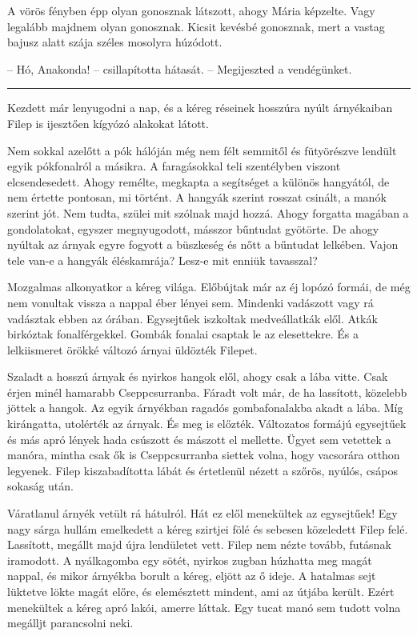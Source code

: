 \documentclass[10pt]{memoir}
\renewcommand{\pfbreakdisplay}{\bigskip \ding{166} \bigskip}
\newcommand{\secbreak}{\fancybreak{\pfbreakdisplay}\indent}
\begin{document}
A vörös fényben épp olyan gonosznak látszott, ahogy Mária képzelte. Vagy
legalább majdnem olyan gonosznak. Kicsit kevésbé gonosznak, mert a vastag
bajusz alatt szája széles mosolyra húzódott.

-- Hó, Anakonda! -- csillapította hátasát. -- Megijeszted a vendégünket.

\secbreak

Kezdett már lenyugodni a nap, és a kéreg réseinek hosszúra nyúlt árnyékaiban
Filep is ijesztően kígyózó alakokat látott.

Nem sokkal azelőtt a pók hálóján még nem félt semmitől és fütyörészve lendült
egyik pókfonalról a másikra. A faragásokkal teli szentélyben viszont
elcsendesedett. Ahogy remélte, megkapta a segítséget a különös hangyától, de
nem értette pontosan, mi történt. A hangyák szerint rosszat csinált, a manók
szerint jót. Nem tudta, szülei mit szólnak majd hozzá. Ahogy forgatta magában a
gondolatokat, egyszer megnyugodott, másszor bűntudat gyötörte. De ahogy nyúltak
az árnyak egyre fogyott a büszkeség és nőtt a bűntudat lelkében. Vajon tele
van-e a hangyák éléskamrája? Lesz-e mit enniük tavasszal?

Mozgalmas alkonyatkor a kéreg világa. Előbújtak már az éj lopózó formái, de még
nem vonultak vissza a nappal éber lényei sem. Mindenki vadászott vagy rá
vadásztak ebben az órában. Egysejtűek iszkoltak medveállatkák elől. Atkák
birkóztak fonalférgekkel. Gombák fonalai csaptak le az elesettekre. És a
lelkiismeret örökké változó árnyai üldözték Filepet.

Szaladt a hosszú árnyak és nyirkos hangok elől, ahogy csak a lába vitte. Csak
érjen minél hamarabb Cseppcsurranba. Fáradt volt már, de ha lassított, közelebb
jöttek a hangok. Az egyik árnyékban ragadós gombafonalakba akadt a lába. Míg
kirángatta, utolérték az árnyak. És meg is előzték. Változatos formájú
egysejtűek és más apró lények hada csúszott és mászott el mellette. Ügyet sem
vetettek a manóra, mintha csak ők is Cseppcsurranba siettek volna, hogy
vacsorára otthon legyenek. Filep kiszabadította lábát és értetlenül nézett a
szőrös, nyúlós, csápos sokaság után.

Váratlanul árnyék vetült rá hátulról. Hát ez elől menekültek az egysejtűek! Egy
nagy sárga hullám emelkedett a kéreg szirtjei fölé és sebesen közeledett Filep
felé. Lassított, megállt majd újra lendületet vett. Filep nem nézte tovább,
futásnak iramodott. A nyálkagomba egy sötét, nyirkos zugban húzhatta meg magát
nappal, és mikor árnyékba borult a kéreg, eljött az ő ideje. A hatalmas sejt
lüktetve lökte magát előre, és elemésztett mindent, ami az útjába került. Ezért
menekültek a kéreg apró lakói, amerre láttak. Egy tucat manó sem tudott volna
megálljt parancsolni neki.
\end{document}
